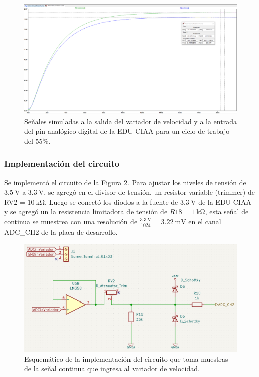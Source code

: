 \begin{figure}[H]
    \centering
    \includegraphics[width=1.1\linewidth]{Figuras/datalogger/Hardware/adc55PercentPwm.png}
    \caption{Señales simuladas a la salida del variador de velocidad y a la entrada del pin analógico-digital de la EDU-CIAA para un ciclo de trabajo del 55\%.}
    \label{fig:adc55PercentPwm}
\end{figure}

\subsubsection{Implementación del circuito}

Se implementó el circuito de la Figura \ref{fig:esquemADCTunel}. Para ajustar los niveles de tensión de $\SI{3.5}{\volt}$ a $\SI{3.3}{\volt}$, se agregó en el divisor de tensión, un resistor variable (trimmer) de RV2 = $\SI{10}{\kilo\ohm}$. Luego se conectó los diodos a la fuente de $\SI{3.3}{\volt}$ de la EDU-CIAA y se agregó un la resistencia limitadora de tensión de $R18 = \SI{1}{\kilo\ohm}$, esta señal de continua se muestrea con una resolución  de $\frac{\SI{3.3}{\volt}}{1024} = \SI{3.22}{\milli\volt}$  en el canal ADC\_CH2 de la placa de desarrollo.

\begin{figure}[H]
    \centering
    \includegraphics[width=1.1\linewidth]{Figuras/datalogger/Hardware/esquemADCTunel.png}
    \caption{Esquemático de la implementación del circuito que toma muestras de la señal continua que ingresa al variador de velocidad.}
    \label{fig:esquemADCTunel}
\end{figure}

